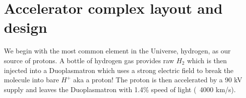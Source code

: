 \section{Accelerator complex layout and design} \label{sec:lhc:layout}

We begin with the most common element in the Universe, hydrogen, as our source
of protons.  A bottle of hydrogen gas provides raw $H_{2}$ which is then
injected into a Duoplasmatron which uses a strong electric field to break the
molecule into bare $H^{+}$ aka a proton!  The proton is then accelerated by a 90
kV supply and leaves the Duoplasmatron with 1.4\% speed of light (~4000
km/s).

